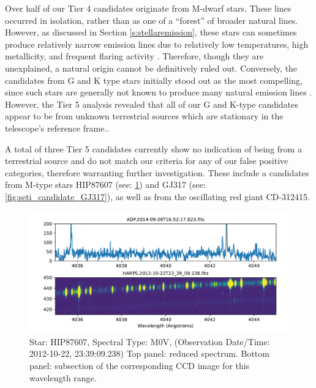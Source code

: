 \documentclass[twocolumn]{aastex701}
\begin{document}
Over half of our Tier 4 candidates originate from M-dwarf stars. These lines occurred in isolation, rather than as one of a ``forest'' of broader natural lines. However, as discussed in Section \ref{s:stellaremission}, these stars can sometimes produce relatively narrow emission lines due to relatively low temperatures, high metallicity, and frequent flaring activity \citep{Marcy_2021}. Therefore, though they are unexplained, a natural origin cannot be definitively ruled out. Conversely, the candidates from G and K type stars initially stood out as the most compelling, since such stars are generally not known to produce many natural emission lines \citep{stellar_emission_linesJ}. However, the Tier 5 analysis revealed that all of our G and K-type candidates appear to be from unknown terrestrial sources which are stationary in the telescope's reference frame..

A total of three Tier 5 candidates currently show no indication of being from a terrestrial source and do not match our criteria for any of our false positive categories, therefore warranting further investigation. These include a candidates from M-type stars HIP87607 (see: \ref{fig:seti_candidate_HIP87607}) and GJ317 (see: \ref{fig:seti_candidate_GJ317}), as well as from the oscillating red giant CD-312415.

\begin{figure}
    \centering  \includegraphics[width=\textwidth]{clean-figures/seti_candidate_HIP87607.pdf}
    \caption{Star: HIP87607, Spectral Type: M0V, (Observation Date/Time: 2012-10-22, 23:39:09.238) Top panel: reduced spectrum. Bottom panel: subsection of the corresponding CCD image for this wavelength range.}
    \label{fig:seti_candidate_HIP87607}
\end{figure}
\end{document}
